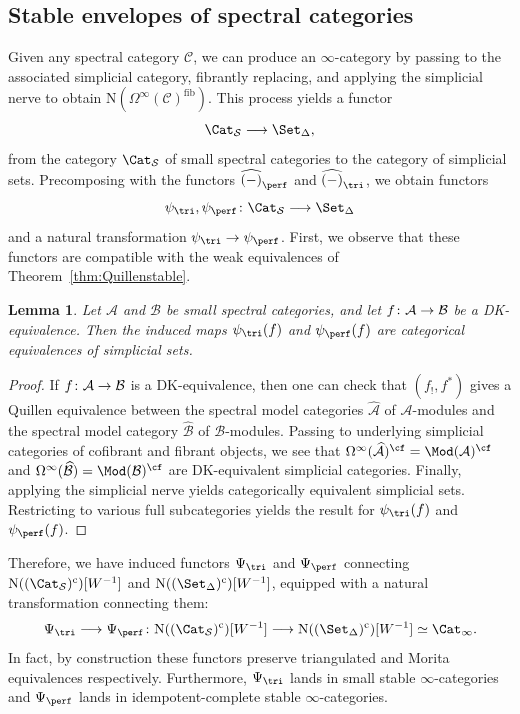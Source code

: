 \documentclass{amsart}
\renewcommand{\to}{\mathchoice{\longrightarrow}{\rightarrow}{\rightarrow}{\rightarrow}}
\let\catsymbfont\mathcal
\newcommand{\aA}{{\catsymbfont{A}}}
\newcommand{\aB}{{\catsymbfont{B}}}
\newcommand{\aC}{{\catsymbfont{C}}}
\newcommand{\N}{\mathrm{N}}
\newcommand{\icat}{\Cat_\i}
\newcommand{\Spcat}{\Cat_\mathcal{S}}%
\newcommand{\sset}{\Set_{\Delta}}
\newcommand{\too}{\longrightarrow}%
\renewcommand{\i}{\infty}
\numberwithin{equation}{section}
\newtheorem{lemma}[equation]{Lemma}
\theoremstyle{definition}
\begin{document}
\subsection{Stable envelopes of spectral categories}
Given any spectral category $\aC$, we can produce an $\i$-category by
passing to the associated simplicial category, fibrantly replacing, and applying the simplicial nerve to obtain $\N(\Omega^\i(\aC)^{\textrm{fib}})$.
This process yields a functor
\[
\Spcat \too \sset,
\]
from the category $\Spcat$ of small spectral categories to the
category of simplicial sets.  Precomposing with the functors
$\widehat{(-)}_{\perf}$ and $\widehat{(-)}_{\tri}$, we obtain functors 
\[
\psi_{\tri},\psi_{\perf} \colon \Spcat\too \sset
\]
and a natural transformation $\psi_{\tri} \to \psi_{\perf}$.  First,
we observe that these functors are compatible with the weak
equivalences of Theorem~\ref{thm:Quillenstable}.

\begin{lemma}\label{lem:preservesequiv}
Let $\aA$ and $\aB$ be small spectral categories, and let $f \colon
\aA \to \aB$ be a DK-equivalence.  Then the induced maps
$\psi_{\tri}(f)$ and $\psi_{\perf}(f)$ are categorical equivalences of
simplicial sets.
\end{lemma}

\begin{proof}
If $f\colon \aA\to\aB$ is a DK-equivalence, then one can check that
$(f_!,f^*)$ gives a Quillen equivalence between the spectral model
categories $\widehat{\aA}$ of $\aA$-modules and the spectral model
category $\widehat{\aB}$ of $\aB$-modules.  Passing to underlying
simplicial categories of cofibrant and fibrant objects, we see that
$\Omega^\i(\widehat{\aA})^{\cf}=\Mod(\aA)^{\cf}$ and
$\Omega^\i(\widehat{\aB})=\Mod(\aB)^{\cf}$ are DK-equivalent
simplicial categories.  Finally, applying the simplicial nerve yields
categorically equivalent simplicial sets.  Restricting to various full
subcategories yields the result for $\psi_{\tri}(f)$ and
$\psi_{\perf}(f)$.
\end{proof}

Therefore, we have induced functors $\Psi_{\tri}$ and $\Psi_{\perf}$
connecting $\N((\Spcat)^{\mathrm{c}})[W^{-1}]$ and
$\N((\sset)^{\mathrm{c}})[W^{-1}]$, equipped with a natural
transformation connecting them:
\[
\Psi_{\tri}\to \Psi_{\perf} \colon \N((\Spcat)^{\mathrm{c}})[W^{-1}] \too
\N((\sset)^{\mathrm{c}})[W^{-1}] \simeq \icat.
\]
In fact, by construction these functors preserve triangulated and
Morita equivalences respectively.  Furthermore, $\Psi_{\tri}$ lands in
small stable $\i$-categories and $\Psi_{\perf}$ lands in
idempotent-complete stable $\i$-categories.
\end{document}
